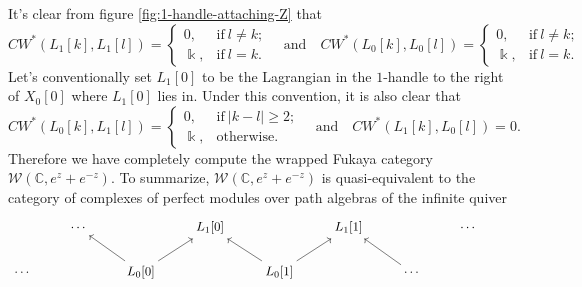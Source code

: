 \begin{exmp}
    It's clear from figure \ref{fig:1-handle-attaching-Z} that\[
        CW^{\ast} (L_1[k],L_1[l])=\left\{\begin{array}{ll}
            0,&\text{if}\ l\neq k;\\
            \Bbbk,&\text{if}\ l=k.
        \end{array}\right.\quad\text{and}\quad CW^{\ast} (L_0 [k],L_0[l])=\left\{\begin{array}{ll}
            0,&\text{if}\ l\neq k;\\
            \Bbbk,&\text{if}\ l=k.
        \end{array}\right.
    \]Let's conventionally set $L_1[0]$ to be the Lagrangian in the $1$-handle to the right of $X_0[0]$ where $L_1[0]$ lies in. Under this convention, it is also clear that \[
        CW^{\ast} (L_0[k],L_1 [l])=\left\{\begin{array}{ll}
            0,&\text{if}\ \vert k-l\vert\geq 2;\\ 
            \Bbbk,&\text{otherwise}.
        \end{array}\right.\quad\text{and}\quad CW^{\ast} (L_1[k],L_0[l])=0.
    \]Therefore we have completely compute the wrapped Fukaya category $\mathcal{W} (\mathbb{C}, e^z+e^{-z})$. To summarize, $\mathcal{W} (\mathbb{C},e^z+e^{-z})$ is quasi-equivalent to the category of complexes of perfect modules over path algebras of the infinite quiver \[
        \begin{tikzcd}
            &\dotsb &&L_1[0] &&L_1 [1] &&\dotsb&\\
            \dotsb&&L_0[0]\arrow[ru]\arrow[lu]&&L_0[1]\arrow[ru]\arrow[lu]&&\dotsb\arrow[lu]
        \end{tikzcd}
    \]
\end{exmp}
